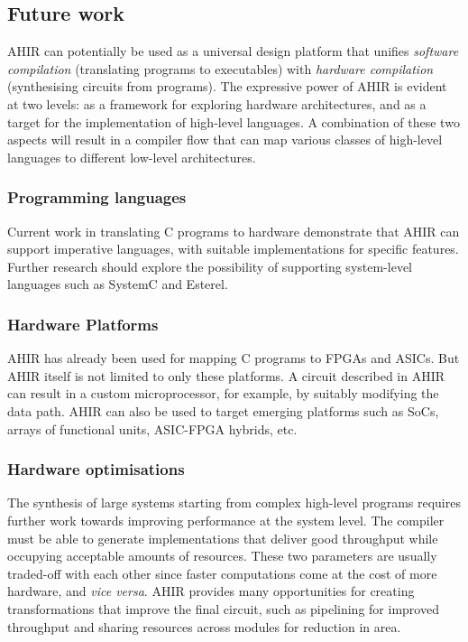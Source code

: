 \documentclass[12pt]{article}
\begin{document}
\subsection{Future work}

AHIR can potentially be used as a universal design platform that
unifies {\it software compilation} (translating programs to
executables) with {\it hardware compilation} (synthesising circuits
from programs). The expressive power of AHIR is evident at two levels:
as a framework for exploring hardware architectures, and as a target
for the implementation of high-level languages. A combination of these
two aspects will result in a compiler flow that can map various
classes of high-level languages to different low-level architectures.

\subsubsection{Programming languages}

Current work in translating C programs to hardware demonstrate that
AHIR can support imperative languages, with suitable implementations
for specific features. Further research should explore the possibility
of supporting system-level languages such as SystemC and Esterel.

\subsubsection{Hardware Platforms}

AHIR has already been used for mapping C programs to FPGAs and ASICs.
But AHIR itself is not limited to only these platforms. A circuit
described in AHIR can result in a custom microprocessor, for example,
by suitably modifying the data path. AHIR can also be used to
target emerging platforms such as SoCs, arrays of functional units,
ASIC-FPGA hybrids, etc.

\subsubsection{Hardware optimisations}

The synthesis of large systems starting from complex high-level
programs requires further work towards improving performance at the
system level. The compiler must be able to generate implementations
that deliver good throughput while occupying acceptable amounts of
resources. These two parameters are usually traded-off with each other
since faster computations come at the cost of more hardware, and {\it
vice versa}. AHIR provides many opportunities for creating
transformations that improve the final circuit, such as pipelining for
improved throughput and sharing resources across modules for reduction
in area.
\end{document}
